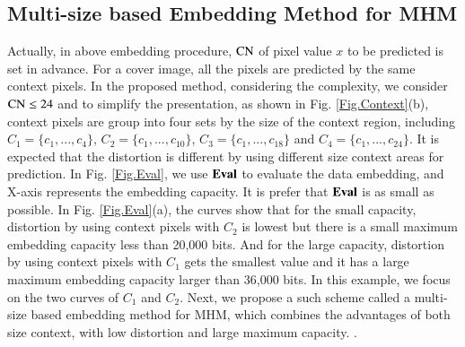 \documentclass[review,3p,10pt,sort&compress]{elsarticle}
\begin{document}
\subsection{Multi-size based Embedding Method for MHM}\label{sec:3.2}
Actually, in above embedding procedure, ${\rm CN}$ of pixel value $x$ to be predicted is set in advance. For a cover image, all the pixels are predicted by the same context pixels. In the proposed method, considering the complexity, we consider ${\rm CN} \leq24$ and to simplify the presentation, as shown in Fig. \ref{Fig.Context}(b), context pixels are group into four sets by the size of the context region, including $C_1 = \{c_1, ..., c_4\}$, $C_2 = \{c_1, ..., c_{10}\}$, $C_3 = \{c_1, ..., c_{18}\}$ and $C_4 = \{c_1, ..., c_{24}\}$. It is expected that the distortion is different by using different size context areas for prediction. In Fig. \ref{Fig.Eval}, we use ${\rm \mathbf{Eval}}$ to evaluate the data embedding, and X-axis represents the embedding capacity. It is prefer that ${\rm \mathbf{Eval}}$ is as small as possible. In Fig. \ref{Fig.Eval}(a), the curves show that for the small capacity, distortion by using context pixels with $C_2$ is lowest but there is a small maximum embedding capacity less than 20,000 bits. And for the large capacity, distortion by using context pixels with $C_1$ gets the smallest value and it has a large maximum embedding capacity larger than 36,000 bits. In this example, we focus on the two curves of $C_1$ and $C_2$. Next, we propose a such scheme called a multi-size based embedding method for MHM, which combines the advantages of both size context, with low distortion and large maximum capacity. .
\end{document}
